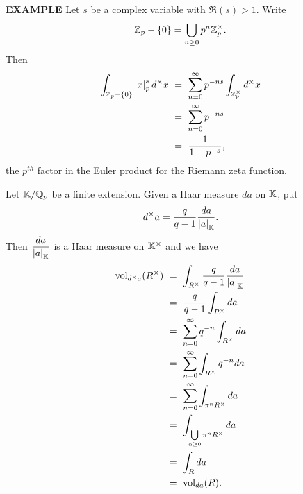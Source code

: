 \begingroup
\allowdisplaybreaks
\begin{x}{\small\bf EXAMPLE} %
Let $s$ be a complex variable with $\Re(s) > 1$.  Write 
\[
\mathbb{Z}_p - \{0\} = \bigcup\limits_{n \geq 0} p^n \mathbb{Z}_p^\times.
\]
Then
\[
\allowdisplaybreaks
\begin{aligned}
\allowdisplaybreaks
\int_{\Z_p-\{0\}} \abs{x}_p^s d^\times x  \
&= \ \sum_{n = 0}^\infty p^{-ns} \int_{\Z_p^\times} d^\times x \\
&= \ \sum_{n = 0}^\infty p^{-ns} \\
&= \ \frac{1}{1 - p^{-s}},
\end{aligned}
\]
the $p^{th}$ factor in the Euler product for the Riemann zeta function.

\vspace{0.1cm}

Let $\mathbb{K}/\mathbb{Q}_p$ be a finite extension. 
Given a Haar measure $da$ on $\mathbb{K}$, put
\[
d^\times a = \frac{q}{q-1} \frac{da}{\left\vert a\right\vert_{\mathbb{K}}}.
\]
Then $\displaystyle\frac{da}{\left\vert a\right\vert_{\mathbb{K}}}$ is a Haar measure on $\mathbb{K}^\times$ and we have
\allowdisplaybreaks
\begin{align*}
\allowdisplaybreaks
\vol_{d^\times a} (R^\times) \ 
&= \ \int_{R^\times} \frac{q}{q-1} \frac{da}{\abs{a}_\K}\\
&= \ \frac{q}{q-1} \int_{R^\times}  da\\
&= \ \sum_{n = 0}^\infty q^{-n} \int_{R^\times}  da\\
&= \ \sum_{n = 0}^\infty \int_{R^\times}  q^{-n} da\\
&= \ \sum_{n = 0}^\infty \int_{\pi^nR^\times}  da\\
&= \ \int_{\bigcup\limits_{n \ge 0}\pi^nR^\times}  da\\
&= \ \int_R da \\
&= \  \vol_{da}(R).
\end{align*}
\end{x}
\endgroup






















